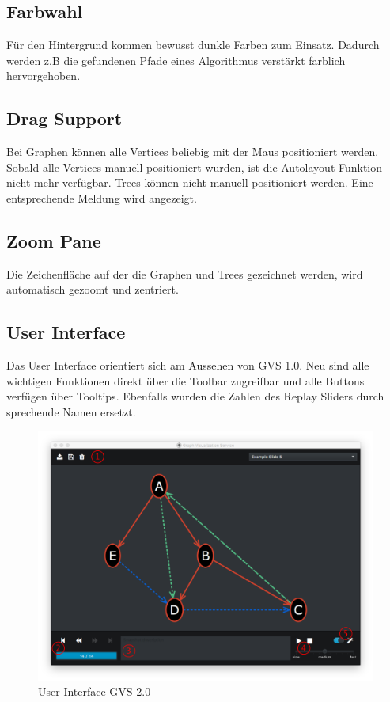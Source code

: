 \documentclass[11pt,a4paper,english,oneside]{book}
\numberwithin{equation}{chapter}
\begin{document}
	\subsection{Farbwahl}
	Für den Hintergrund kommen bewusst dunkle Farben zum Einsatz. Dadurch werden z.B die gefundenen Pfade eines Algorithmus verstärkt farblich hervorgehoben. 
	
	\subsection{Drag Support}
	Bei Graphen können alle Vertices beliebig mit der Maus positioniert werden. Sobald alle Vertices manuell positioniert wurden, ist die Autolayout Funktion nicht mehr verfügbar. Trees können nicht manuell positioniert werden. Eine entsprechende Meldung wird angezeigt.
	
	\subsection{Zoom Pane}
	Die Zeichenfläche auf der die Graphen und Trees gezeichnet werden, wird automatisch gezoomt und zentriert. 
	
	\subsection{User Interface}
	Das User Interface orientiert sich am Aussehen von GVS 1.0. Neu sind alle wichtigen Funktionen direkt über die Toolbar zugreifbar und alle Buttons verfügen über Tooltips. Ebenfalls wurden die Zahlen des Replay Sliders durch sprechende Namen ersetzt.
	
	\begin{figure}[h!]
		\centering
		\includegraphics[width=0.7\linewidth]{assets/images/gvs-ui-graph}
		\caption{User Interface GVS 2.0}
		\label{fig:gvs-ui-graph}
	\end{figure}
	
\end{document}
